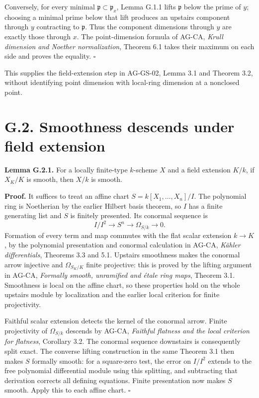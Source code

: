 \documentclass[11pt,a4paper,openany]{report}
\begin{document}
Conversely, for every minimal \(\mathfrak p\subset\mathfrak p_x\), Lemma G.1.1 lifts \(\mathfrak p\) below the prime of \(y\); choosing a minimal prime below that lift produces an upstairs component through \(y\) contracting to \(\mathfrak p\). Thus the component dimensions through \(y\) are exactly those through \(x\). The point-dimension formula of AG-CA, \emph{Krull dimension and Noether normalization}, Theorem 6.1 takes their maximum on each side and proves the equality. \(\square\)

This supplies the field-extension step in AG-GS-02, Lemma 3.1 and Theorem 3.2, without identifying point dimension with local-ring dimension at a nonclosed point.

\section{G.2. Smoothness descends under field extension}\label{AG-RG-S08-g.2.-smoothness-descends-under-field-extension}

\textbf{Lemma G.2.1.} For a locally finite-type \(k\)-scheme \(X\) and a field extension \(K/k\), if \(X_K/K\) is smooth, then \(X/k\) is smooth.

\textbf{Proof.} It suffices to treat an affine chart \(S=k[X_1,\ldots,X_n]/I\). The polynomial ring is Noetherian by the earlier Hilbert basis theorem, so \(I\) has a finite generating list and \(S\) is finitely presented. Its conormal sequence is \[
I/I^2\longrightarrow S^n\longrightarrow\Omega_{S/k}\longrightarrow0.
\] Formation of every term and map commutes with the flat scalar extension \(k\to K\), by the polynomial presentation and conormal calculation in AG-CA, \emph{Kähler differentials}, Theorems 3.3 and 5.1. Upstairs smoothness makes the conormal arrow injective and \(\Omega_{S_K/K}\) finite projective: this is proved by the lifting argument in AG-CA, \emph{Formally smooth, unramified and étale ring maps}, Theorem 3.1. Smoothness is local on the affine chart, so these properties hold on the whole upstairs module by localization and the earlier local criterion for finite projectivity.

Faithful scalar extension detects the kernel of the conormal arrow. Finite projectivity of \(\Omega_{S/k}\) descends by AG-CA, \emph{Faithful flatness and the local criterion for flatness}, Corollary 3.2. The conormal sequence downstairs is consequently split exact. The converse lifting construction in the same Theorem 3.1 then makes \(S\) formally smooth: for a square-zero test, the error on \(I/I^2\) extends to the free polynomial differential module using this splitting, and subtracting that derivation corrects all defining equations. Finite presentation now makes \(S\) smooth. Apply this to each affine chart. \(\square\)
\end{document}

